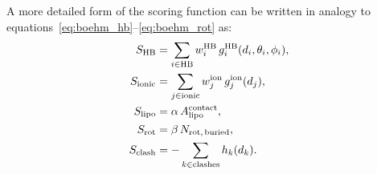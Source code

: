 \documentclass[12pt, a4paper]{article}
\begin{document}
A more detailed form of the scoring function can be written in analogy to
equations~\eqref{eq:boehm_hb}--\eqref{eq:boehm_rot} as:
\begin{align}
  S_{\text{HB}}
  &=
  \sum_{i \in \text{HB}}
  w_i^{\text{HB}} \,
  g_i^{\text{HB}}(d_i, \theta_i, \phi_i),
  \label{eq:flexx_hb}
  \\
  S_{\text{ionic}}
  &=
  \sum_{j \in \text{ionic}}
  w_j^{\text{ion}} \,
  g_j^{\text{ion}}(d_j),
  \label{eq:flexx_ionic}
  \\
  S_{\text{lipo}}
  &=
  \alpha \,
  A_{\text{lipo}}^{\text{contact}},
  \label{eq:flexx_lipo}
  \\
  S_{\text{rot}}
  &=
  \beta \,
  N_{\text{rot,\,buried}},
  \label{eq:flexx_rot}
  \\
  S_{\text{clash}}
  &=
  - \sum_{k \in \text{clashes}}
  h_k(d_k).
  \label{eq:flexx_clash}
\end{align}
\end{document}
